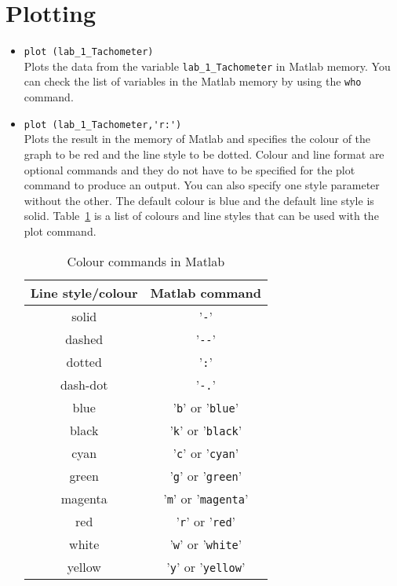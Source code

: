 \section{Plotting}

\begin{itemize}
\item \verb|plot (lab_1_Tachometer)|\\
Plots the data from the variable \verb|lab_1_Tachometer| in \textsf{Matlab} memory.
You can check the list of variables in the \textsf{Matlab} memory by using the
\verb|who| command.

\item \verb|plot (lab_1_Tachometer,'r:')|\\
Plots the result in the memory of \textsf{Matlab} and specifies the colour of
the graph to be red and the line style to be dotted.  Colour and line format
are optional commands and they do not have to be specified for the plot
command to produce an output. You can also specify one style parameter
without the other.  The default colour is blue and the default line style is
solid.  Table~\ref{tab:colour} is a list of colours and line styles that can
be used with the plot command.
\begin{table}[htbp]
\centering
\begin{tabular}{|c|c|}\hline
Line style/colour & \textsf{Matlab} command\\\hline
solid & '\verb|-|'\\\hline
dashed &'\verb|--|'\\\hline
dotted & '\verb|:|'\\\hline
dash-dot&'\verb|-.|'\\\hline
blue & '\verb|b|' or '\verb|blue|'\\\hline
black& '\verb|k|' or '\verb|black|'\\\hline
cyan & '\verb|c|' or '\verb|cyan|' \\ \hline
green & '\verb|g|' or '\verb|green|' \\\hline
magenta & '\verb|m|' or '\verb|magenta|' \\ \hline
red & '\verb|r|' or '\verb|red|'\\ \hline
white & '\verb|w|' or '\verb|white|'\\ \hline
yellow &'\verb|y|' or '\verb|yellow|' \\ \hline
\end{tabular}
\caption{Colour commands in \textsf{Matlab}}\label{tab:colour}
\end{table}


\end{itemize}
